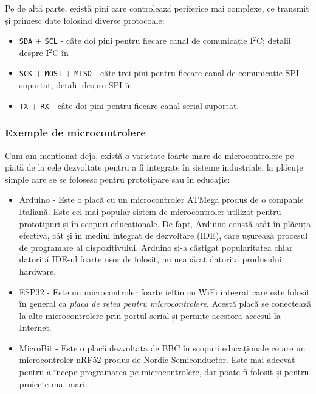 Pe de altă parte, există pini care controlează periferice mai complexe, ce
transmit și primesc date folosind diverse protocoale:

\begin{itemize}
  \item \texttt{SDA} + \texttt{SCL} - câte doi pini pentru fiecare canal de comunicație I$^2$C; detalii despre I$^2$C în 
  \item \texttt{SCK} + \texttt{MOSI} + \texttt{MISO} - câte trei pini pentru fiecare canal de
          comunicație SPI suportat; detalii despre SPI în 
  \item \texttt{TX} + \texttt{RX} - câte doi pini pentru fiecare canal serial suportat.
\end{itemize}

\subsubsection{Exemple de microcontrolere}
\label{sec:embed:micro-comp:micro:example}

Cum am menționat deja, există o varietate foarte mare de microcontrolere pe
piață de la cele dezvoltate pentru a fi integrate în sisteme industriale, la
plăcuțe simple care se se folosesc pentru prototipare sau în educație:

\begin{itemize}
	\item Arduino - Este o placă cu un microcontroler ATMega produs de o
		companie Italiană. Este cel mai popular sistem de microcontroler
		utilizat pentru prototipuri și în scopuri educaționale. De fapt,
		Arduino constă atât în plăcuța efectivă, cât și în mediul
		integrat de dezvoltare (IDE), care ușurează procesul de
		programare al dispozitivului. Arduino și-a câștigat
		popularitatea chiar datorită IDE-ul foarte ușor de folosit, nu
		neapărat datorită produsului hardware.
	\item ESP32 - Este un microcontroler foarte ieftin cu WiFi integrat care este folosit
		în general ca \textit{placa de rețea pentru microcontrolere}. Acestă placă se conectează la
		alte microcontrolere prin portul serial și permite acestora accesul la Internet.
	\item MicroBit - Este o placă dezvoltata de BBC în scopuri educaționale ce are 
		un microcontroler nRF52 produs de Nordic Semiconductor. Este mai adecvat pentru
		a începe programarea pe microcontrolere, dar poate fi folosit și pentru
		proiecte mai mari.
\end{itemize}


